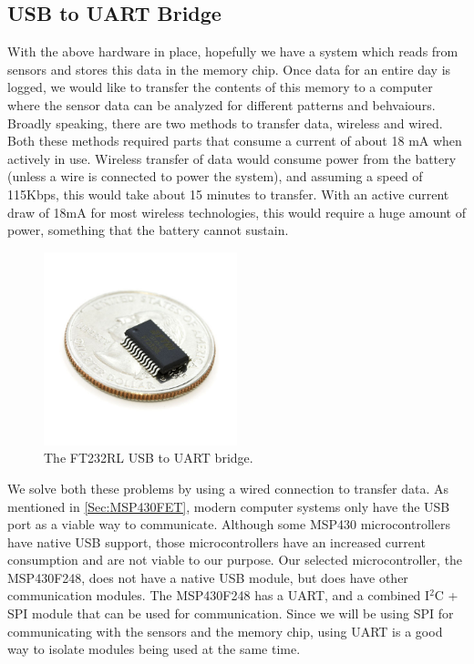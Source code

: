 \subsection{USB to UART Bridge}
\label{Sec:FT232}
With the above hardware in place, hopefully we have a system which reads from sensors and stores this data in the memory chip. Once data for an entire day is logged, we would like to transfer the contents of this memory to a computer where the sensor data can be analyzed for different patterns and behvaiours. Broadly speaking, there are two methods to transfer data, wireless and wired. Both these methods required parts that consume a current of about 18 mA when actively in use. Wireless transfer of data would consume power from the battery (unless a wire is connected to power the system), and assuming a speed of 115Kbps, this would take about 15 minutes to transfer. With an active current draw of 18mA for most wireless technologies, this would require a huge amount of power, something that the battery cannot sustain.
\begin{figure}
\begin{center}
\includegraphics[width=0.5\textwidth]{images/FT232coin.jpg}
\caption{The FT232RL USB to UART bridge.}
\label{Fig:FT232}
\end{center}
\end{figure}

We solve both these problems by using a wired connection to transfer data. As mentioned in \ref{Sec:MSP430FET}, modern computer systems only have the USB port as a viable way to communicate. Although some MSP430 microcontrollers have native USB support, those microcontrollers have an increased current consumption and are not viable to our purpose. Our selected microcontroller, the MSP430F248, does not have a native USB module, but does have other communication modules. The MSP430F248 has a UART, and a combined I$^2$C + SPI module that can be used for communication. Since we will be using SPI for communicating with the sensors and the memory chip, using UART is a good way to isolate modules being used at the same time. 

